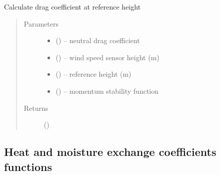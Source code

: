 \documentclass[letterpaper,10pt,english]{sphinxmanual}
\begin{document}

\begin{fulllineitems}
\label{\detokenize{index:flux_subs.cd_calc}}
Calculate drag coefficient at reference height
\begin{quote}\begin{description}
\item[{Parameters}] \leavevmode\begin{itemize}
\item {} 
 (\href{https://docs.python.org/3/library/functions.html\#float}{}) -- neutral drag coefficient

\item {} 
 (\href{https://docs.python.org/3/library/functions.html\#float}{}) -- wind speed sensor height (m)

\item {} 
 (\href{https://docs.python.org/3/library/functions.html\#float}{}) -- reference height (m)

\item {} 
 (\href{https://docs.python.org/3/library/functions.html\#float}{}) -- momentum stability function

\end{itemize}

\item[{Returns}] \leavevmode
{} (\href{https://docs.python.org/3/library/functions.html\#float}{})

\end{description}\end{quote}

\end{fulllineitems}


\subsection{Heat and moisture exchange coefficients functions}
\label{\detokenize{index:heat-and-moisture-exchange-coefficients-functions}}
\end{document}
